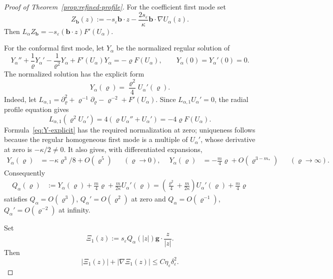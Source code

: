 \documentclass[11pt,reqno]{amsart}
\numberwithin{equation}{section}
\theoremstyle{definition}
\theoremstyle{remark}
\newcommand{\eps}{\varepsilon}
\newcommand{\etae}{\eta_{\eps}}
\newcommand{\de}{\delta_{\eps}}
\begin{document}
\begin{proof}[Proof of Theorem~\ref{prop:refined-profile}]
For the coefficient first mode set
\begin{equation}
  Z_{\mathbf{b}}(z)
  :=
  -s_\eps \mathbf{b}\cdot z
  -\frac{2s_\eps}{\kappa}
   \mathbf{b}\cdot\nabla U_\alpha(z).
  \label{eq:explicit-first-mode}
\end{equation}
Then
\(L_\alpha Z_{\mathbf{b}} = -s_\eps(\mathbf{b}\cdot z)F'(U_\alpha).\)

{ 
For the conformal first mode, let $Y_\alpha$ be the normalized regular
solution of
\begin{equation}
  Y_\alpha''
  +\frac1{\varrho}Y_\alpha'
  -\frac1{\varrho^2}Y_\alpha
  +F'(U_\alpha)Y_\alpha
  =
  -\varrho F(U_\alpha),
  \qquad
  Y_\alpha(0)=Y_\alpha'(0)=0.
  \label{eq:Y-first-mode}
\end{equation}}
The normalized solution has the explicit form
\begin{equation}\label{eq:Y-explicit}
 Y_\alpha(\varrho)=\frac{\varrho^2}{4}U_\alpha'(\varrho).
\end{equation}
Indeed, let $L_{\alpha,1}=\partial_\varrho^2+
\varrho^{-1}\partial_\varrho-\varrho^{-2}+F'(U_\alpha)$.
Since $L_{\alpha,1}U_\alpha'=0$, the radial profile equation gives
\[
 L_{\alpha,1}(\varrho^2U_\alpha')
 =4(\varrho U_\alpha''+U_\alpha')
 =-4\varrho F(U_\alpha).
\]
Formula~\eqref{eq:Y-explicit} has the required normalization at zero;
uniqueness follows because the regular homogeneous first mode is a
multiple of $U_\alpha'$, whose derivative at zero is $-\kappa/2\ne0$.
It also gives, with differentiated expansions,
\[
 \begin{aligned}
 Y_\alpha(\varrho)&=-\kappa\varrho^3/8+O(\varrho^5)
 &&(\varrho\to0),\quad\
 Y_\alpha(\varrho)&=-\frac m4\varrho+O(\varrho^{3-m_*})
 &&(\varrho\to\infty).
 \end{aligned}
\]
Consequently
\begin{equation}\label{eq:Q-first-mode}
 \begin{aligned}
 Q_\alpha(\varrho)
 &:=Y_\alpha(\varrho)+\frac m4\varrho
       +\frac{m}{2\kappa}U_\alpha'(\varrho) =\left(\frac{\varrho^2}{4}+\frac{m}{2\kappa}\right)
       U_\alpha'(\varrho)+\frac m4\varrho
 \end{aligned}
\end{equation}
satisfies $Q_\alpha=O(\varrho^3)$, $Q_\alpha'=O(\varrho^2)$ at zero
and $Q_\alpha=O(\varrho^{-1})$, $Q_\alpha'=O(\varrho^{-2})$ at infinity.

Set
{ 
\begin{equation}
  \Xi_1(z)
  :=
  s_\eps Q_\alpha(|z|)
  \mathbf{g}\cdot\frac z{|z|}.
  \label{eq:Xi1-definition}
\end{equation}
}
Then
\begin{equation}
  |\Xi_1(z)|+|\nabla\Xi_1(z)|
  \le C\etae\de^2.
  \label{eq:Xi1-bound}
\end{equation}


\end{proof}
\end{document}
